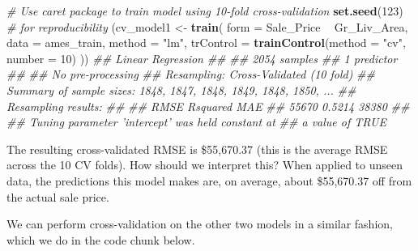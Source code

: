 \documentclass[]{krantz}
\makeatletter
\newenvironment{Shaded}{\begin{snugshade}}{\end{snugshade}}
\newcommand{\CommentTok}[1]{\textcolor[rgb]{0.37,0.37,0.37}{\textit{#1}}}
\newcommand{\DataTypeTok}[1]{\textcolor[rgb]{0.27,0.27,0.27}{#1}}
\newcommand{\DecValTok}[1]{\textcolor[rgb]{0.06,0.06,0.06}{#1}}
\newcommand{\KeywordTok}[1]{\textcolor[rgb]{0.27,0.27,0.27}{\textbf{#1}}}
\newcommand{\NormalTok}[1]{#1}
\newcommand{\OperatorTok}[1]{\textcolor[rgb]{0.43,0.43,0.43}{\textbf{#1}}}
\newcommand{\StringTok}[1]{\textcolor[rgb]{0.5,0.5,0.5}{#1}}
\newenvironment{kframe}{%
\medskip{}
\setlength{\fboxsep}{.8em}
 \def\at@end@of@kframe{}%
 \ifinner\ifhmode%
  \def\at@end@of@kframe{\end{minipage}}%
  \begin{minipage}{\columnwidth}%
 \fi\fi%
 \def\FrameCommand##1{\hskip\@totalleftmargin \hskip-\fboxsep
 \colorbox{shadecolor}{##1}\hskip-\fboxsep
     \hskip-\linewidth \hskip-\@totalleftmargin \hskip\columnwidth}%
 \MakeFramed {\advance\hsize-\width
   \@totalleftmargin\z@ \linewidth\hsize
   \@setminipage}}%
 {\par\unskip\endMakeFramed%
 \at@end@of@kframe}
\renewenvironment{Shaded}{\begin{kframe}}{\end{kframe}}
\makeatother
\begin{document}
\begin{Shaded}
\begin{Highlighting}[]
\CommentTok{# Use caret package to train model using 10-fold cross-validation}
\KeywordTok{set.seed}\NormalTok{(}\DecValTok{123}\NormalTok{)  }\CommentTok{# for reproducibility}
\NormalTok{(cv_model1 <-}\StringTok{ }\KeywordTok{train}\NormalTok{(}
  \DataTypeTok{form =}\NormalTok{ Sale_Price }\OperatorTok{~}\StringTok{ }\NormalTok{Gr_Liv_Area, }
  \DataTypeTok{data =}\NormalTok{ ames_train, }
  \DataTypeTok{method =} \StringTok{"lm"}\NormalTok{,}
  \DataTypeTok{trControl =} \KeywordTok{trainControl}\NormalTok{(}\DataTypeTok{method =} \StringTok{"cv"}\NormalTok{, }\DataTypeTok{number =} \DecValTok{10}\NormalTok{)}
\NormalTok{))}
\CommentTok{## Linear Regression }
\CommentTok{## }
\CommentTok{## 2054 samples}
\CommentTok{##    1 predictor}
\CommentTok{## }
\CommentTok{## No pre-processing}
\CommentTok{## Resampling: Cross-Validated (10 fold) }
\CommentTok{## Summary of sample sizes: 1848, 1847, 1848, 1849, 1848, 1850, ... }
\CommentTok{## Resampling results:}
\CommentTok{## }
\CommentTok{##   RMSE   Rsquared  MAE  }
\CommentTok{##   55670  0.5214    38380}
\CommentTok{## }
\CommentTok{## Tuning parameter 'intercept' was held constant at}
\CommentTok{##  a value of TRUE}
\end{Highlighting}
\end{Shaded}

The resulting cross-validated RMSE is \$55,670.37 (this is the average RMSE across the 10 CV folds). How should we interpret this? When applied to unseen data, the predictions this model makes are, on average, about \$55,670.37 off from the actual sale price.

We can perform cross-validation on the other two models in a similar fashion, which we do in the code chunk below.
\end{document}

